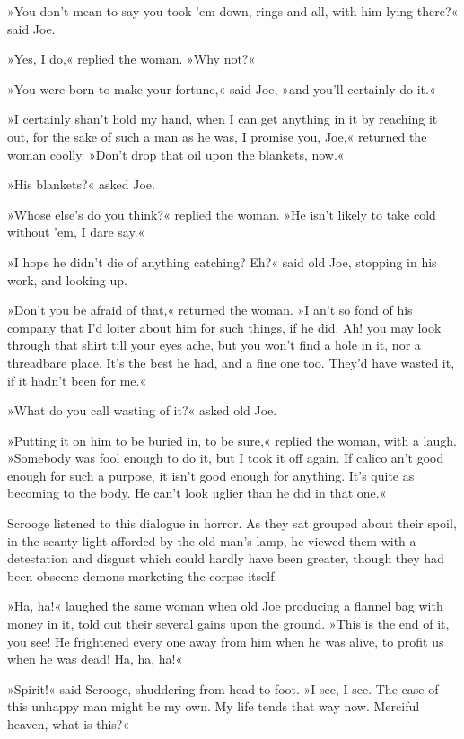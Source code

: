 »You don't mean to say you took 'em down, rings and all, with him lying there?« said Joe.

»Yes, I do,« replied the woman. »Why not?«

»You were born to make your fortune,« said Joe, »and you'll certainly do it.«

»I certainly shan't hold my hand, when I can get anything in it by reaching it out, for the sake of such a man as he was, I promise you, Joe,« returned the woman coolly. »Don't drop that oil upon the blankets, now.«

»His blankets?« asked Joe.

»Whose else's do you think?« replied the woman. »He isn't likely to take cold without 'em, I dare say.«

»I hope he didn't die of anything catching? Eh?« said old Joe, stopping in his work, and looking up.

»Don't you be afraid of that,« returned the woman. »I an't so fond of his company that I'd loiter about him for such things, if he did. Ah! you may look through that shirt till your eyes ache, but you won't find a hole in it, nor a threadbare place. It's the best he had, and a fine one too. They'd have wasted it, if it hadn't been for me.«

»What do you call wasting of it?« asked old Joe.

»Putting it on him to be buried in, to be sure,« replied the woman, with a laugh. »Somebody was fool enough to do it, but I took it off again. If calico an't good enough for such a purpose, it isn't good enough for anything. It's quite as becoming to the body. He can't look uglier than he did in that one.«

Scrooge listened to this dialogue in horror. As they sat grouped about their spoil, in the scanty light afforded by the old man's lamp, he viewed them with a detestation and disgust which could hardly have been greater, though they had been obscene demons marketing the corpse itself.

»Ha, ha!« laughed the same woman when old Joe producing a flannel bag with money in it, told out their several gains upon the ground. »This is the end of it, you see! He frightened every one away from him when he was alive, to profit us when he was dead! Ha, ha, ha!«

»Spirit!« said Scrooge, shuddering from head to foot. »I see, I see. The case of this unhappy man might be my own. My life tends that way now. Merciful heaven, what is this?«

